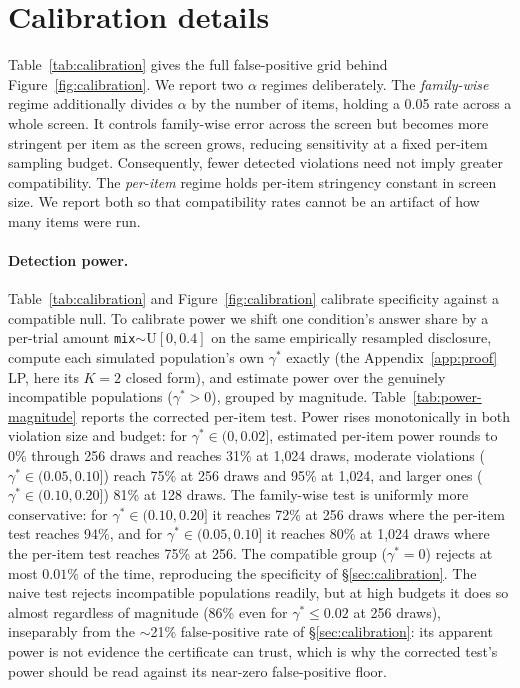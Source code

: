 \section{Calibration details}
\label{app:calibration}

Table~\ref{tab:calibration} gives the full false-positive grid behind
Figure~\ref{fig:calibration}. We report two $\alpha$ regimes deliberately. The
\emph{family-wise} regime additionally divides $\alpha$ by the number of items,
holding a 0.05 rate across a whole screen. It controls family-wise error
across the screen but becomes more stringent per item as the screen grows,
reducing sensitivity at a fixed per-item sampling budget. Consequently, fewer
detected violations need not imply greater compatibility. The
\emph{per-item} regime holds per-item stringency constant in screen size. We
report both so that compatibility rates cannot be an artifact of how many
items were run.





\paragraph{Detection power.} Table~\ref{tab:calibration} and
Figure~\ref{fig:calibration} calibrate specificity against a compatible null.
To calibrate power we shift one condition's answer share by a per-trial amount
\texttt{mix}$\sim$U$[0,0.4]$ on the same empirically resampled disclosure,
compute each simulated population's own $\gamma^*$ exactly (the
Appendix~\ref{app:proof} LP, here its $K{=}2$ closed form), and estimate power
over the genuinely incompatible populations ($\gamma^*>0$), grouped by
magnitude. Table~\ref{tab:power-magnitude} reports the corrected per-item test.
Power rises monotonically in both violation size and budget: for
$\gamma^*\in(0,0.02]$, estimated per-item power rounds to 0\% through 256 draws
and reaches 31\% at 1{,}024 draws, moderate violations ($\gamma^*\in(0.05,0.10]$) reach 75\% at 256 draws and
95\% at 1{,}024, and larger ones ($\gamma^*\in(0.10,0.20]$) 81\% at 128 draws.
The family-wise test is uniformly more conservative: for
$\gamma^*\in(0.10,0.20]$ it reaches 72\% at 256 draws where the per-item test
reaches 94\%, and for $\gamma^*\in(0.05,0.10]$ it reaches 80\% at 1{,}024 draws
where the per-item test reaches 75\% at 256. The compatible group ($\gamma^*{=}0$) rejects at most
$0.01\%$ of the time, reproducing the specificity of \S\ref{sec:calibration}.
The naive test rejects incompatible populations readily, but at high budgets it
does so almost regardless of magnitude (86\% even for $\gamma^*\le0.02$ at 256
draws), inseparably from the $\sim$21\% false-positive rate of
\S\ref{sec:calibration}: its apparent power is not evidence the certificate can
trust, which is why the corrected test's power should be read against its
near-zero false-positive floor.




